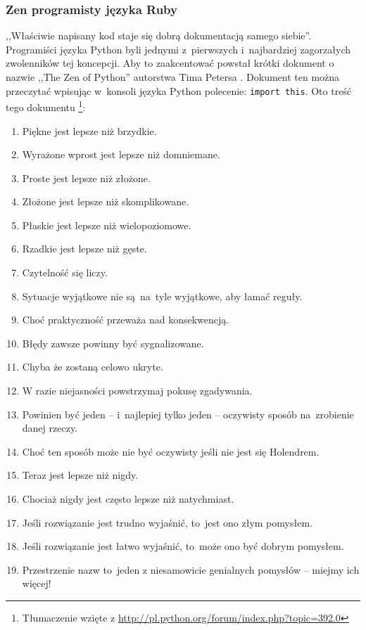 \subsubsection{Zen programisty języka Ruby} \label{dokumentacja.zenruby}

,,Właściwie napisany kod staje się dobrą dokumentacją samego siebie''. Programiści języka Python byli jednymi z~pierwszych i~najbardziej zagorzałych zwolenników tej koncepcji. Aby to zaakcentować powstał krótki dokument o nazwie ,,The Zen of Python'' autorstwa Tima Petersa \cite{zenpython}. Dokument ten można przeczytać wpisując w~konsoli języka Python polecenie: \texttt{import this}. Oto treść tego dokumentu \footnote{Tłumaczenie wzięte z \url{http://pl.python.org/forum/index.php?topic=392.0}}:

\begin{enumerate}
  \item Piękne jest lepsze niż brzydkie.
  \item Wyrażone wprost jest lepsze niż domniemane.
  \item Proste jest lepsze niż złożone.
  \item Złożone jest lepsze niż skomplikowane.
  \item Płaskie jest lepsze niż wielopoziomowe.
  \item Rzadkie jest lepsze niż gęste.
  \item Czytelność się liczy.
  \item Sytuacje wyjątkowe nie są~na~tyle wyjątkowe, aby łamać reguły.
  \item Choć praktyczność przeważa nad konsekwencją.
  \item Błędy zawsze powinny być sygnalizowane.
  \item Chyba że zostaną celowo ukryte.
  \item W razie niejasności powstrzymaj pokusę zgadywania.
  \item Powinien być jeden -- i~najlepiej tylko jeden -- oczywisty sposób na~zrobienie danej rzeczy.
  \item Choć ten sposób może nie być oczywisty jeśli nie jest się Holendrem.
  \item Teraz jest lepsze niż nigdy.
  \item Chociaż nigdy jest często lepsze niż natychmiast.
  \item Jeśli rozwiązanie jest trudno wyjaśnić, to~jest ono złym pomysłem.
  \item Jeśli rozwiązanie jest łatwo wyjaśnić, to~może ono być dobrym pomysłem.
  \item Przestrzenie nazw to~jeden z niesamowicie genialnych pomysłów -- miejmy ich więcej!
\end{enumerate}

